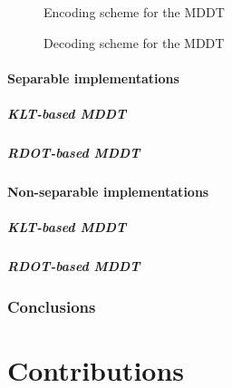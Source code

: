 \documentclass[11pt,a4paper,openright,twoside]{book}
\numberwithin{equation}{section} %
\numberwithin{figure}{section} %
\numberwithin{table}{section} %
\begin{document}
\begin{figure}[tp]
	\centering
	
	\caption{Encoding scheme for the \ac{MDDT}}
	\label{fig:enc_mddt}
\end{figure}

\begin{figure}[tp]
	\centering
	
	\caption{Decoding scheme for the \ac{MDDT}}
	\label{fig:dec_mddt}
\end{figure}

\subsection{Separable implementations}
\label{sub:separable_implementations}


\subsubsection{\ac{KLT}-based \ac{MDDT}}
\label{ssub:sep_klt_based_mddt}
\subsubsection{\ac{RDOT}-based \ac{MDDT}}
\label{ssub:sep_rdot_based_mddt}

\subsection{Non-separable implementations}
\label{sub:non_separable_implementations}

\subsubsection{\ac{KLT}-based \ac{MDDT}}
\label{ssub:nsep_klt_based_mddt}
\subsubsection{\ac{RDOT}-based \ac{MDDT}}
\label{ssub:nsep_rdot_based_mddt}

\section{Conclusions}
\label{sec:conclusions}

\part{Contributions}
\label{prt:contributions}
\end{document}
